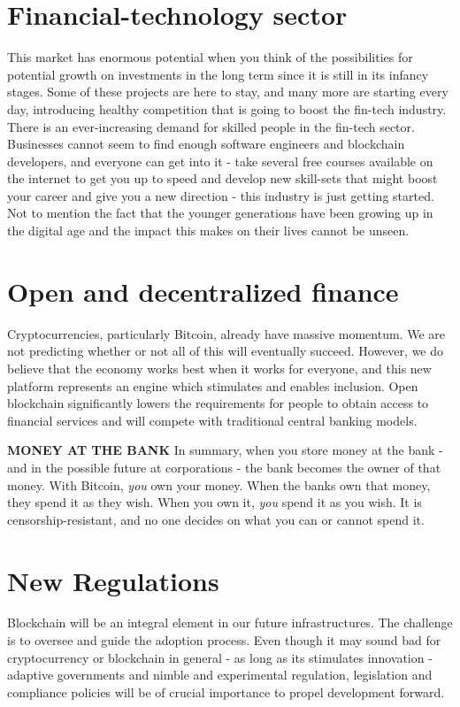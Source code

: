 \section*{Financial-technology sector}
This market has enormous potential when you think of the possibilities for potential growth on investments in the long term since it is still in its infancy stages. Some of these projects are here to stay, and many more are starting every day, introducing healthy competition that is going to boost the fin-tech industry. There is an ever-increasing demand for skilled people in the fin-tech sector. Businesses cannot seem to find enough software engineers and blockchain developers, and everyone can get into it - take several free courses available on the internet to get you up to speed and develop new skill-sets that might boost your career and give you a new direction - this industry is just getting started. Not to mention the fact that the younger generations have been growing up in the digital age and the impact this makes on their lives cannot be unseen.

\section*{Open and decentralized finance}
Cryptocurrencies, particularly Bitcoin, already have massive momentum. We are not predicting whether or not all of this will eventually succeed. However, we do believe that the economy works best when it works for everyone, and this new platform represents an engine which stimulates and enables inclusion. Open blockchain significantly lowers the requirements for people to obtain access to financial services and will compete with traditional central banking models.

    \bigskip
    \begin{cryptobox}{\textbf{MONEY AT THE BANK}}
        In summary, when you store money at the bank - and in the possible future at corporations - the bank becomes the owner of that money. With Bitcoin, \emph{you} own your money. When the banks own that money, they spend it as they wish. When you own it, \emph{you} spend it as you wish. It is censorship-resistant, and no one decides on what you can or cannot spend it.
    \end{cryptobox}

\section*{New Regulations}
Blockchain will be an integral element in our future infrastructures. The challenge is to oversee and guide the adoption process. Even though it may sound bad for cryptocurrency or blockchain in general - as long as its stimulates innovation - adaptive governments and nimble and experimental regulation, legislation and compliance policies will be of crucial importance to propel development forward. 


